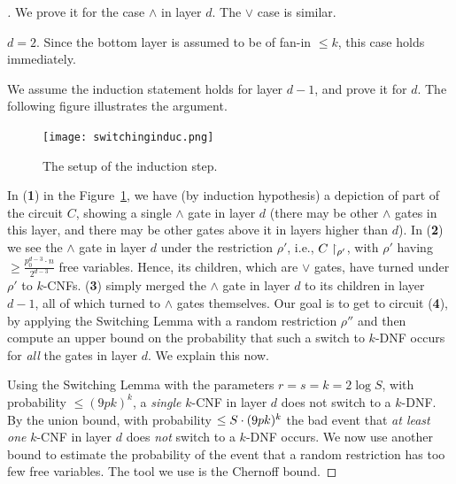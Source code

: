 \begin{proof}[]
We prove it for the case $\land$ in layer $d$. The $\lor$ case is similar.  

\Base $d = 2$. Since the bottom layer is assumed to be of fan-in $\leq k$,  
this case holds immediately.  

\Induction   
We assume the induction statement holds for layer $d-1$, and prove it for $d$. The following figure illustrates the argument. 




\begin{figure}[H]
    \begin{center}
    \texttt{[image: switchinginduc.png]}
    \end{center}\label{fig:depth-reduction-use}
    \caption{The setup of the induction step.}
\end{figure}
 In (\textbf{1}) in the  Figure~\ref{fig:depth-reduction-use},  we have (by induction hypothesis) a depiction of part of the circuit $C$, showing a single $\land$ gate in layer $d$ (there  may be other $\land$ gates in this layer, and there may be other gates above it in layers higher than $d$). 
In (\textbf{2}) we see the $\land$ gate in layer $d$ under the restriction $\rho'$, i.e., $C\upharpoonright_{\rho'}$, with $\rho'$ having $\geq \frac{p_0^{d-3} \cdot n}{2^{d-3}}$ free variables. Hence, its children, which are $\lor$ gates, have turned under $\rho'$ to  $k$-CNFs.
 (\textbf{3}) simply merged the $\land$ gate in layer $d$ to its children in layer $d-1$, all of which turned to $\land$ gates themselves. 
Our goal is to get to circuit (\textbf{4}), by applying the Switching Lemma with a random restriction $\rho''$ and then compute an upper bound on the probability that such a switch to $k$-DNF occurs for \emph{all} the gates in layer $d$. We explain this now.


\smallskip 



Using the Switching Lemma with the parameters \( r = s = k = 2 \log S \), with probability \( \leq (9pk)^k \), a \emph{single} $k$-CNF in layer \( d \) does not switch to a $k$-DNF.
By the union bound, with probability \( \leq S\cdot(9pk)^k \) the bad event that \emph{at least one} $k$-CNF in layer \( d \) does \emph{not} switch to a $k$-DNF occurs.
We now use another bound to estimate the probability of the event that a random restriction has too few free variables. The tool we use is the Chernoff bound.



\end{proof}
